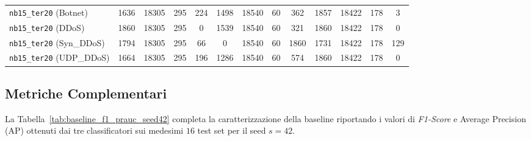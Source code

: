 \begin{table}[H]
{\begin{tabular}{lcccccccccccc}
        \texttt{nb15\_ter20} (Botnet) & 1636 & 18305 & 295 & 224 & 1498 & 18540 & 60 & 362 & 1857 & 18422 & 178 & 3 \\
        \texttt{nb15\_ter20} (DDoS) & 1860 & 18305 & 295 & 0 & 1539 & 18540 & 60 & 321 & 1860 & 18422 & 178 & 0 \\
        \texttt{nb15\_ter20} (Syn\_DDoS) & 1794 & 18305 & 295 & 66 & 0 & 18540 & 60 & 1860 & 1731 & 18422 & 178 & 129 \\
        \texttt{nb15\_ter20} (UDP\_DDoS) & 1664 & 18305 & 295 & 196 & 1286 & 18540 & 60 & 574 & 1860 & 18422 & 178 & 0 \\
        \bottomrule
    \end{tabular}
    }
\end{table}

\subsection{Metriche Complementari}

La Tabella~\ref{tab:baseline_f1_prauc_seed42} completa la caratterizzazione della baseline riportando i valori di \textit{F1-Score} e Average Precision (AP) ottenuti dai tre classificatori sui medesimi $16$ test set per il seed $s=42$.

